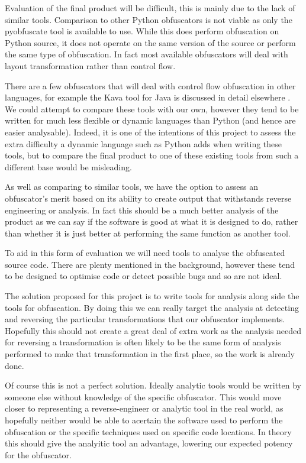 \documentclass{report}
\begin{document}
Evaluation of the final product will be difficult, this is mainly due to the lack of similar tools.
Comparison to other Python obfuscators is not viable as only the pyobfuscate tool is available to
use. While this does perform obfuscation on Python source, it does not operate on the same version of
the source or perform the same type of obfuscation. In fact most available obfuscators will deal with
layout transformation rather than control flow.

There are a few obfuscators that will deal with control flow obfuscation in other languages, for example
the Kava tool for Java is discussed in detail elsewhere \cite{taxobftrans}. We could attempt to compare these
tools with our own, however they tend to be written for much less flexible or dynamic languages than
Python (and hence are easier analysable). Indeed, it is one of the intentions of this project to assess the
extra difficulty a dynamic language such as Python adds when writing these tools, but to compare the final
product to one of these existing tools from such a different base would be misleading.

As well as comparing to similar tools, we have the option to assess an obfuscator's merit based on
its ability to create output that withstands reverse engineering or analysis. In fact this should be
a much better analysis of the product as we can say if the software is good at what it is designed to do, rather
than whether it is just better at performing the same function as another tool.

To aid in this form of evaluation we will need tools to analyse the obfuscated source code. There are plenty
mentioned in the background, however these tend to be designed to optimise code or detect possible bugs and so
are not ideal.

The solution proposed for this project is to write tools for analysis along side the tools for obfuscation.
By doing this we can really target the analysis at detecting and reversing the particular transformations
that our obfuscator implements. Hopefully this should not create a great deal of extra work as the analysis
needed for reversing a transformation is often likely to be the same form of analysis performed to make that
transformation in the first place, so the work is already done.

Of course this is not a perfect solution. Ideally analytic tools would be written by someone else without
knowledge of the specific obfuscator. This would move closer to representing a reverse-engineer or analytic
tool in the real world, as hopefully neither would be able to acertain the software used to perform the obfuscation
or the specific techniques used on specific code locations. In theory this should give the analyitic tool an
advantage, lowering our expected potency for the obfuscator.
\end{document}
